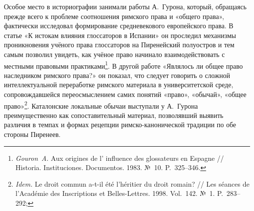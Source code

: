 Особое место в историографии занимали работы А.~Гурона, который, обращаясь прежде всего к проблеме соотношения римского права и «общего права», фактически исследовал формирование средневекового европейского права. В статье «К истокам влияния глоссаторов в Испании» он проследил механизмы проникновения учёного права глоссаторов на Пиренейский полуостров и тем самым позволил увидеть, как учёное право начинало взаимодействовать с местными правовыми практиками\footnote{\emph{Gouron~A.} Aux origines de l' influence des glossateurs en Espagne // Historia. Instituciones. Documentos. 1983. №~10. P.~325--346.}. В другой работе «Являлось ли общее право наследником римского права?» он показал, что следует говорить о сложной интеллектуальной переработке римского материала в университетской среде, сопровождавшейся переосмыслением самих понятий «право», «обычай», «общее право»\footnote{\emph{Idem. }Le droit commun a-t-il été l’héritier du droit romain? // Les séances de l’Académie des Inscriptions et Belles-Lettres. 1998. Vol.~142. №~1. P.~283--292;}. Каталонские локальные обычаи выступали у А.~Гурона преимущественно как сопоставительный материал, позволявший выявить различия в темпах и формах рецепции римско-канонической традиции по обе стороны Пиренеев.

